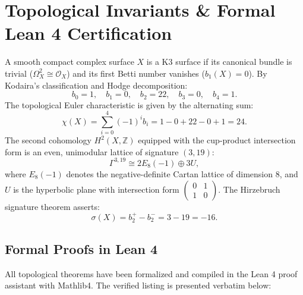 \documentclass[11pt, a4paper]{article}
\begin{document}
\section{Topological Invariants \& Formal Lean 4 Certification}
A smooth compact complex surface $X$ is a K3 surface if its canonical bundle is trivial ($\Omega_X^2 \cong \mathcal{O}_X$) and its first Betti number vanishes ($b_1(X) = 0$). By Kodaira's classification and Hodge decomposition:
\begin{equation}
b_0 = 1, \quad b_1 = 0, \quad b_2 = 22, \quad b_3 = 0, \quad b_4 = 1.
\end{equation}
The topological Euler characteristic is given by the alternating sum:
\begin{equation}
\chi(X) = \sum_{i=0}^4 (-1)^i b_i = 1 - 0 + 22 - 0 + 1 = 24.
\end{equation}
The second cohomology $H^2(X, \mathbb{Z})$ equipped with the cup-product intersection form is an even, unimodular lattice of signature $(3, 19)$:
\begin{equation}
\Gamma^{3,19} \cong 2 E_8(-1) \oplus 3 U,
\end{equation}
where $E_8(-1)$ denotes the negative-definite Cartan lattice of dimension 8, and $U$ is the hyperbolic plane with intersection form $\begin{pmatrix} 0 & 1 \\ 1 & 0 \end{pmatrix}$. The Hirzebruch signature theorem asserts:
\begin{equation}
\sigma(X) = b_2^+ - b_2^- = 3 - 19 = -16.
\end{equation}

\subsection{Formal Proofs in Lean 4}
All topological theorems have been formalized and compiled in the Lean 4 proof assistant with Mathlib4. The verified listing is presented verbatim below:
\end{document}
